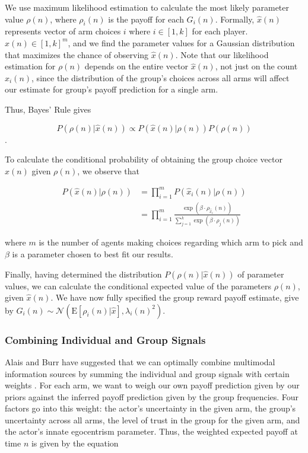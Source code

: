 \documentclass[11pt, a4paper]{article}
\begin{document}
We use maximum likelihood estimation to calculate the most likely parameter value $\rho(n)$, where $\rho_i(n)$ is the payoff for each $G_i(n)$. Formally, $\hat{x}(n)$ represents vector of arm choices $i$ where $i \in [1, k]$ for each player. $\hat{x}(n) \in [1, k]^m$, and we find the parameter values for a Gaussian distribution that maximizes the chance of observing $\hat{x}(n)$. Note that our likelihood estimation for $\rho(n)$ depends on the entire vector $\hat{x}(n)$, not just on the count $\hat{x}_i(n)$, since the distribution of the group's choices across all arms will affect our estimate for group's payoff prediction for a single arm.

Thus, Bayes' Rule gives

$$P(\rho(n)|\hat{x}(n)) \propto P(\hat{x}(n)|\rho(n))P(\rho(n))$$.

To calculate the conditional probability of obtaining the group choice vector $\hat{x}(n)$ given $\rho(n)$, we observe that

\begin{align*}
P(\hat{x}(n)|\rho(n)) & = \prod_{i=1}^m P(\hat{x}_i(n)|\rho(n)) \\
& = \prod_{i=1}^m \frac{\exp(\beta \cdot \rho_{\hat{x}_i}(n))}{\sum_{j=1}^k \exp(\beta \cdot \rho_j(n))}
\end{align*}

where $m$ is the number of agents making choices regarding which arm to pick and $\beta$ is a parameter chosen to best fit our results.

Finally, having determined the distribution $P(\rho(n)|\hat{x}(n))$ of parameter values, we can calculate the conditional expected value of the parameters $\rho(n)$, given $\hat{x}(n)$. We have now fully specified the group reward payoff estimate, give by $G_i(n) \sim \mathcal{N} (\mathrm{E}[\rho_i(n)|\hat{x}], \lambda_i(n)^2)$.

\subsubsection{Combining Individual and Group Signals}

Alais and Burr have suggested that we can optimally combine multimodal information sources by summing the individual and group signals with certain weights \cite{Alais_2004}. For each arm, we want to weigh our own payoff prediction given by our priors against the inferred payoff prediction given by the group frequencies. Four factors go into this weight: the actor's uncertainty in the given arm, the group's uncertainty across all arms, the level of trust in the group for the given arm, and the actor's innate egocentrism parameter. Thus, the weighted expected payoff at time $n$ is given by the equation 
\end{document}
